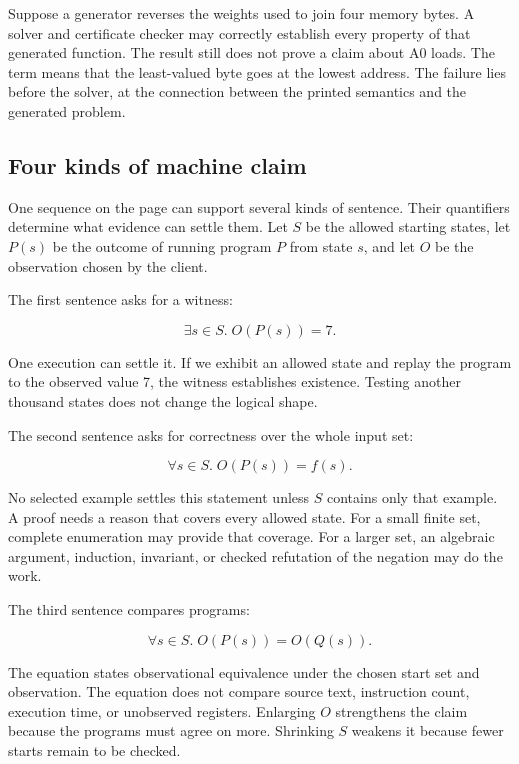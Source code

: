 \begin{example}[title={A correct proof of the wrong byte order}]
Suppose a generator reverses the weights used to join four memory bytes. A
solver and certificate checker may correctly establish every property of that
generated function. The result still does not prove a claim about A0 loads.
The term  means that the least-valued byte goes at the
lowest address. The failure lies before the solver, at the connection
between the printed semantics and the generated problem.
\end{example}

\subsection{Four kinds of machine claim}

One sequence on the page can support several kinds of sentence. Their
quantifiers determine what evidence can settle them. Let \(S\) be the allowed
starting states, let \(P(s)\) be the outcome of running program \(P\) from state
\(s\), and let \(O\) be the observation chosen by the client.

The first sentence asks for a witness:

\[
  \exists s\in S.\; O(P(s))=7.
\]

One execution can settle it. If we exhibit an allowed state and replay the
program to the observed value 7, the witness establishes existence. Testing
another thousand states does not change the logical shape.

The second sentence asks for correctness over the whole input set:

\[
  \forall s\in S.\; O(P(s))=f(s).
\]

No selected example settles this statement unless \(S\) contains only that
example. A proof needs a reason that covers every allowed state. For a small
finite set, complete enumeration may provide that coverage. For a larger set,
an algebraic argument, induction, invariant, or checked refutation of the
negation may do the work.

The third sentence compares programs:

\[
  \forall s\in S.\; O(P(s))=O(Q(s)).
\]

The equation states observational equivalence under the chosen start set and observation.
The equation does not compare source text, instruction count, execution time,
or unobserved registers. Enlarging \(O\) strengthens the claim because the
programs must agree on more. Shrinking \(S\) weakens it because fewer starts
remain to be checked.

